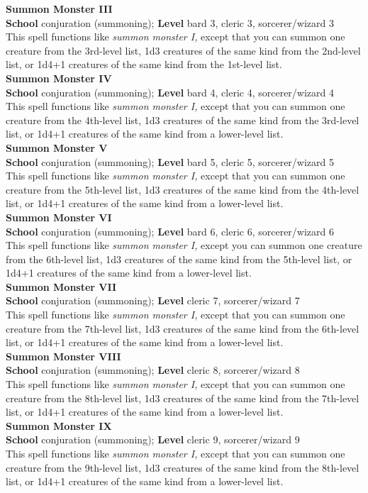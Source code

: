 \textbf{Summon Monster III}\\
\textbf{School} conjuration (summoning); \textbf{Level} bard 3, cleric 3, sorcerer/wizard 3\\
This spell functions like \textit{summon monster I, }except that you can summon one creature from the 3rd-level list, 1d3 creatures of the same kind from the 2nd-level list, or 1d4+1 creatures of the same kind from the 1st-level list.\\
\textbf{Summon Monster IV}\\
\textbf{School} conjuration (summoning); \textbf{Level} bard 4, cleric 4, sorcerer/wizard 4\\
This spell functions like \textit{summon monster I, }except that you can summon one creature from the 4th-level list, 1d3 creatures of the same kind from the 3rd-level list, or 1d4+1 creatures of the same kind from a lower-level list.\\
\textbf{Summon Monster V}\\
\textbf{School} conjuration (summoning); \textbf{Level} bard 5, cleric 5, sorcerer/wizard 5\\
This spell functions like \textit{summon monster I, }except that you can summon one creature from the 5th-level list, 1d3 creatures of the same kind from the 4th-level list, or 1d4+1 creatures of the same kind from a lower-level list.\\
\textbf{Summon Monster VI}\\
\textbf{School} conjuration (summoning); \textbf{Level} bard 6, cleric 6, sorcerer/wizard 6\\
This spell functions like \textit{summon monster I, }except you can summon one creature from the 6th-level list, 1d3 creatures of the same kind from the 5th-level list, or 1d4+1 creatures of the same kind from a lower-level list.\\
\textbf{Summon Monster VII}\\
\textbf{School} conjuration (summoning); \textbf{Level} cleric 7, sorcerer/wizard 7\\
This spell functions like \textit{summon monster I, }except that you can summon one creature from the 7th-level list, 1d3 creatures of the same kind from the 6th-level list, or 1d4+1 creatures of the same kind from a lower-level list.\\
\textbf{Summon Monster VIII}\\
\textbf{School} conjuration (summoning); \textbf{Level} cleric 8, sorcerer/wizard 8\\
This spell functions like \textit{summon monster I, }except that you can summon one creature from the 8th-level list, 1d3 creatures of the same kind from the 7th-level list, or 1d4+1 creatures of the same kind from a lower-level list.\\
\textbf{Summon Monster IX}\\
\textbf{School} conjuration (summoning); \textbf{Level} cleric 9, sorcerer/wizard 9\\
This spell functions like \textit{summon monster I, }except that you can summon one creature from the 9th-level list, 1d3 creatures of the same kind from the 8th-level list, or 1d4+1 creatures of the same kind from a lower-level list.\\
